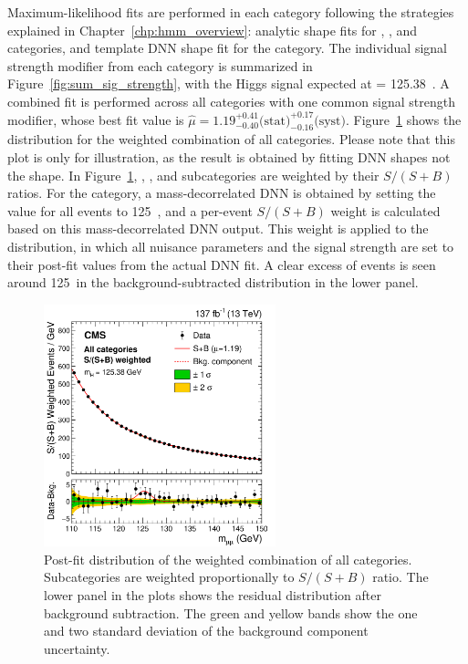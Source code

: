 Maximum-likelihood fits are performed in each category following the strategies explained in Chapter~\ref{chp:hmm_overview}:
analytic \mmm shape fits for \ggH, \ttH, and \VH categories, and template DNN shape fit for the \qqH category.
The individual signal strength modifier from each category is summarized in Figure~\ref{fig:sum_sig_strength},
with the Higgs signal expected at \mh = 125.38~\GeV.
A combined fit is performed across all categories with one common signal strength modifier, 
whose best fit value is $\hat{\mu} = 1.19^{+0.41}_{-0.40} \text{(stat)}^{+0.17}_{-0.16} \text{(syst)}$.
Figure~\ref{fig:sum_mass_shape} shows the \mmm distribution for the weighted combination of all categories.
Please note that this plot is only for illustration, as the \qqH result is obtained by fitting DNN shapes not the \mmm shape.
In Figure~\ref{fig:sum_mass_shape}, \ggH, \ttH, and \VH subcategories are weighted by their $S/(S+B)$ ratios.
For the \qqH category, a mass-decorrelated DNN is obtained by setting the \mmm value for all events to 125~\GeV,
and a per-event $S/(S+B)$ weight is calculated based on this mass-decorrelated DNN output. 
This weight is applied to the \qqH \mmm distribution, 
in which all nuisance parameters and the signal strength are set to their post-fit values from the actual DNN fit.
A clear excess of events is seen around 125~\GeV in the background-subtracted distribution in the lower panel.

\begin{figure}[!htb]
    \centering
    \includegraphics[width=0.60\textwidth]{pics/results/sum_mass_dist.png}
    \caption{Post-fit \mmm distribution of the weighted combination of all categories.
             Subcategories are weighted proportionally to $S/(S+B)$ ratio. 
             The lower panel in the plots shows the residual distribution after background subtraction.
             The green and yellow bands show the one and two standard deviation of the background component uncertainty.}
    \label{fig:sum_mass_shape}
\end{figure}


